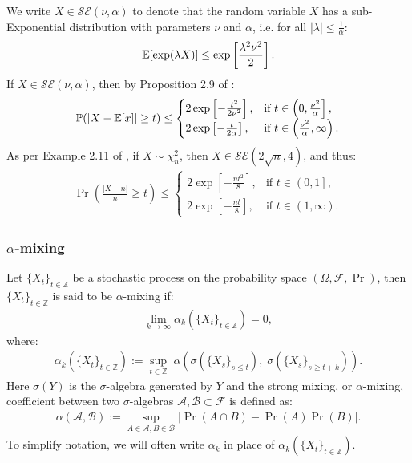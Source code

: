 We write $X\in\mathcal{SE}(\nu, \alpha)$ to denote that the random variable $X$ has a sub-Exponential distribution with parameters $\nu$ and $\alpha$, i.e. for all $|\lambda| \leq \frac{1}{\alpha}$: 
\begin{align*}
    \mathbb{E}[\exp(\lambda X)] \leq \exp\left[\frac{\lambda^2\nu^2}{2}\right].
\end{align*}
If $X\in\mathcal{SE}(\nu, \alpha)$, then by Proposition 2.9 of \cite{Wainwright19}:
\begin{align*}
    \mathbb{P}(|X - \mathbb{E}[x]| \geq t) \leq 
    \begin{cases}
        2 \exp\left[-\frac{t^2}{2\nu^2}\right], & \text{if } t \in \left(0, \frac{\nu^2}{\alpha}\right], \\
        2 \exp\left[-\frac{t}{2\alpha}\right], & \text{if } t \in \left(\frac{\nu^2}{\alpha}, \infty\right).
    \end{cases}
\end{align*}
As per Example 2.11 of \cite{Wainwright19}, if $X \sim \chi^2_n$, then $X\in\mathcal{SE}(2\sqrt{n}, 4)$, and thus: 
\begin{align} \label{eq:chi2-ineq}
    \Pr\left(\frac{|X - n|}{n} \geq t\right) \leq 
    \begin{cases}
        2 \exp\left[-\frac{n t^2}{8}\right], & \text{if } t \in \left(0, 1\right], \\
        2 \exp\left[-\frac{n t}{8}\right], & \text{if } t \in \left(1, \infty\right).
    \end{cases}
\end{align}

\subsubsection{$\alpha$-mixing}

\begin{definition}\label{def:alpha-mixing}
Let $\{X_t\}_{t\in \mathbb{Z}}$ be a stochastic process on the probability space $(\Omega, \mathcal{F}, \Pr)$, then $\{X_t\}_{t\in \mathbb{Z}}$ is said to be $\alpha$-mixing if:
\begin{align*}
    \lim_{k\to\infty} \alpha_k(\{X_t\}_{t\in\mathbb{Z}}) = 0,
\end{align*}
where:
\begin{align*}
    \alpha_k(\{X_t\}_{t\in\mathbb{Z}}) := \sup_{t\in\mathbb{Z}} \; \alpha\left(\sigma(\{X_s\}_{s \leq t}), \; \sigma(\{X_s\}_{s \geq t + k})\right).
\end{align*}
Here $\sigma(Y)$ is the $\sigma$-algebra generated by $Y$ and the strong mixing, or $\alpha$-mixing, coefficient between two $\sigma$-algebras $\mathcal{A}, \mathcal{B} \subset \mathcal{F}$ is defined as:
\begin{align*}
    \alpha(\mathcal{A}, \mathcal{B}) := \sup_{A\in\mathcal{A}, B\in\mathcal{B}} |\Pr(A \cap B) - \Pr(A)\Pr(B)|.
\end{align*}
To simplify notation, we will often write $\alpha_k$ in place of $\alpha_k(\{X_t\}_{t\in\mathbb{Z}})$.
\end{definition}

